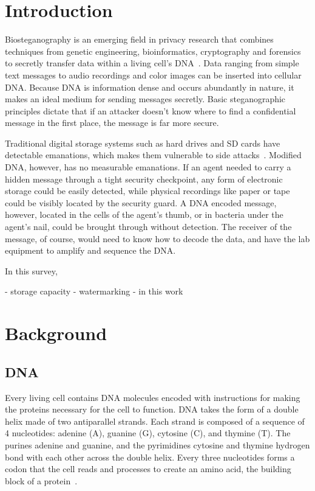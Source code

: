\documentclass[USenglish,oneside,twocolumn]{article}
\begin{document}
\section{Introduction}

Biosteganography is an emerging field in privacy research that combines techniques from genetic engineering, bioinformatics, cryptography and forensics to secretly transfer data within a living cell's DNA~\cite{B2016JOB}. Data ranging from simple text messages to audio recordings and color images can be inserted into cellular DNA. Because DNA is information dense and occurs abundantly in nature, it makes an ideal medium for sending messages secretly. Basic steganographic principles dictate that if an attacker doesn’t know where to find a confidential message in the first place, the message is far more secure.

Traditional digital storage systems such as hard drives and SD cards have detectable emanations, which makes them vulnerable to side attacks~\cite{T2008TOIAS}. Modified DNA, however, has no measurable emanations. If an agent needed to carry a hidden message through a tight security checkpoint, any form of electronic storage could be easily detected, while physical recordings like paper or tape could be visibly located by the security guard. A DNA encoded message, however, located in the cells of the agent's thumb, or in bacteria under the agent's nail, could be brought through without detection. The receiver of the message, of course, would need to know how to decode the data, and have the lab equipment to amplify and sequence the DNA.

In this survey,

- storage capacity
- watermarking
- in this work


\section{Background}

\subsection{DNA}

Every living cell contains DNA molecules encoded with instructions for making the proteins necessary for the cell to function. DNA takes the form of a double helix made of two antiparallel strands. Each strand is composed of a sequence of 4 nucleotides: adenine (A), guanine (G), cytosine (C), and thymine (T). The purines adenine and guanine, and the pyrimidines cytosine and thymine hydrogen bond with each other across the double helix. Every three nucleotides forms a codon that the cell reads and processes to create an amino acid, the building block of a protein~\cite{WC1953N}.
\end{document}
